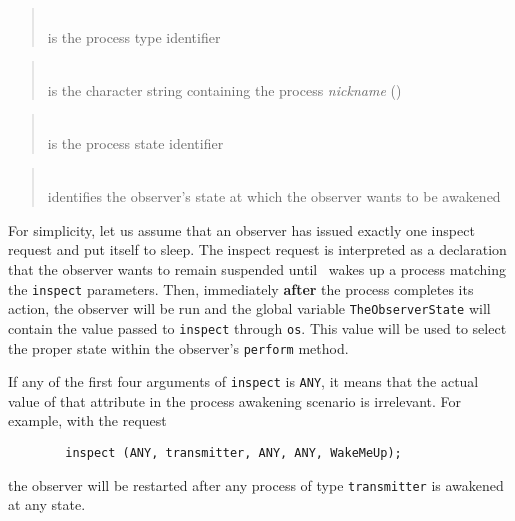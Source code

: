 \begin{quote}
\noindent{}\\ \hspace{0in}
is the process type identifier
\end{quote}

\begin{quote}
\noindent{}\\ \hspace{0in}
is the character string containing the process {\em nickname}
()
\end{quote}

\begin{quote}
\noindent{}\\ \hspace{0in}
is the process state identifier
\end{quote}

\begin{quote}
\noindent{}\\ \hspace{0in}
identifies the observer's state at which the observer wants to be awakened
\end{quote}\medskip

For simplicity, let us assume that an observer has issued exactly
one inspect request and put itself to sleep.
The inspect request is interpreted as a declaration that the observer
wants to remain suspended until \smurph\ wakes up a
process matching the {\tt inspect} parameters.
Then, immediately {\bf after} the process completes its action, the
observer will be run and the global
variable {\tt TheObserverState} will contain the value passed to
{\tt inspect} through {\tt os}.
This value will be used to select the proper state within the
observer's {\tt perform} method.

If any of the first four arguments of {\tt inspect} is {\tt ANY},
it means that the actual value of that attribute in the process
awakening scenario is irrelevant.
For example, with the request
\begin{verbatim}
        inspect (ANY, transmitter, ANY, ANY, WakeMeUp);
\end{verbatim}
the observer will be restarted after any process of type {\tt transmitter}
is awakened at any state.

